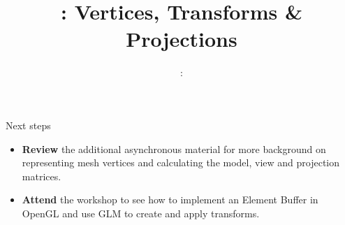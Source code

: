 \usepackage{../../beamerthemeFalmouthGamesAcademy}
\usepackage{multimedia}
\graphicspath{ {../../} }




\usepackage[normalem]{ulem}
\usepackage{wasysym}

\usepackage{pdfpages}

\usetikzlibrary{arrows,automata}




\title{\sessionnumber: Vertices, Transforms \& Projections}
\subtitle{\modulecode: \moduletitle}

\frame{\titlepage} 







\begin{frame}{Next steps}
	\begin{itemize}
		\item \textbf{Review} the additional asynchronous material for more background on representing mesh vertices and calculating the model, view and projection matrices.
		\item \textbf{Attend} the workshop to see how to implement an Element Buffer in OpenGL and use GLM to create and apply transforms.
	\end{itemize}
\end{frame}




